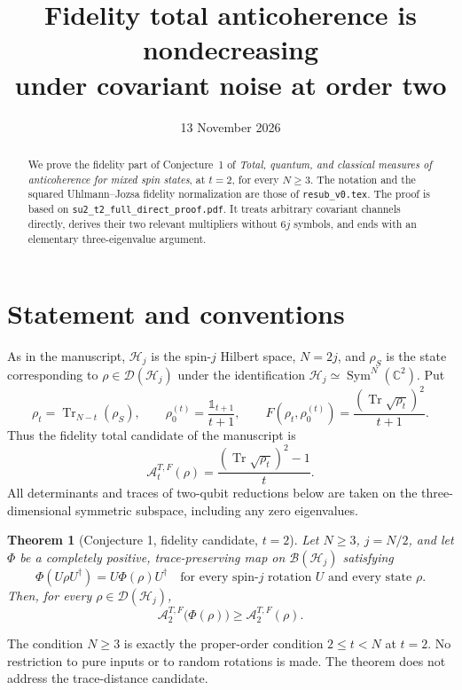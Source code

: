 \documentclass[11pt,a4paper]{article}
\title{Fidelity total anticoherence is nondecreasing\\under covariant noise at order two}
\author{}
\date{13 November 2026}
\DeclareMathOperator{\Tr}{Tr}
\DeclareMathOperator{\Sym}{Sym}
\newcommand{\A}{\mathcal A}
\newcommand{\id}{\mathds{1}}
\newtheorem{theorem}{Theorem}
\begin{document}
\maketitle
\begin{abstract}
We prove the fidelity part of Conjecture~1 of \emph{Total, quantum, and
classical measures of anticoherence for mixed spin states}, at $t=2$, for
every $N\ge3$. The notation and the squared Uhlmann--Jozsa fidelity
normalization are those of \texttt{resub\_v0.tex}. The proof is based on
\texttt{su2\_t2\_full\_direct\_proof.pdf}. It treats arbitrary covariant
channels directly, derives their two relevant multipliers without $6j$
symbols, and ends with an elementary three-eigenvalue argument.
\end{abstract}

\section{Statement and conventions}
As in the manuscript, $\mathcal H_j$ is the spin-$j$ Hilbert space,
$N=2j$, and $\rho_S$ is the state corresponding to
$\rho\in\mathcal D(\mathcal H_j)$ under the identification
$\mathcal H_j\simeq\Sym^N(\mathbb C^2)$. Put
\[
 \rho_t=\Tr_{N-t}(\rho_S),\qquad
 \rho_0^{(t)}=\frac{\id_{t+1}}{t+1},\qquad
 F(\rho_t,\rho_0^{(t)})=\frac{(\Tr\sqrt{\rho_t})^2}{t+1}.
\]
Thus the fidelity total candidate of the manuscript is
\begin{equation}\label{eq:candidate}
 \A_t^{T,F}(\rho)=\frac{(\Tr\sqrt{\rho_t})^2-1}{t}.
\end{equation}
All determinants and traces of two-qubit reductions below are taken on
the three-dimensional symmetric subspace, including any zero eigenvalues.

\begin{theorem}[Conjecture 1, fidelity candidate, $t=2$]\label{thm:main}
Let $N\ge3$, $j=N/2$, and let $\Phi$ be a completely positive,
trace-preserving map on $\mathcal B(\mathcal H_j)$ satisfying
\[
 \Phi(U\rho U^\dagger)=U\Phi(\rho)U^\dagger
 \quad\text{for every spin-$j$ rotation $U$ and every state $\rho$.}
\]
Then, for every $\rho\in\mathcal D(\mathcal H_j)$,
\begin{equation}\label{eq:main}
 \boxed{\A_2^{T,F}\bigl(\Phi(\rho)\bigr)\ge\A_2^{T,F}(\rho).}
\end{equation}
\end{theorem}
The condition $N\ge3$ is exactly the proper-order condition $2\le t<N$
at $t=2$. No restriction to pure inputs or to random rotations is made.
The theorem does not address the trace-distance candidate.
\end{document}
